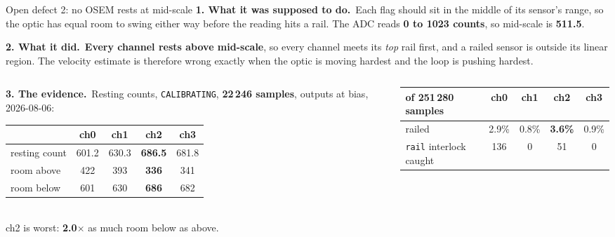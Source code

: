 \documentclass[aspectratio=169]{beamer}
\newcommand{\intended}{\textbf{1. What it was supposed to do.}}
\newcommand{\actual}{\textbf{2. What it did.}}
\newcommand{\evidence}{\textbf{3. The evidence.}}
\begin{document}
\begin{frame}{Open defect 2: no OSEM rests at mid-scale}
  \footnotesize
  \intended\ Each flag should sit in the middle of its sensor's range, so the
  optic has equal room to swing either way before the reading hits a rail. The
  ADC reads \textbf{0 to 1023 counts}, so mid-scale is \textbf{511.5}.

  \vspace{1mm}
  \actual\ \textbf{Every channel rests above mid-scale}, so every channel meets
  its \emph{top} rail first, and a railed sensor is outside its linear region.
  The velocity estimate is therefore wrong exactly when the optic is moving
  hardest and the loop is pushing hardest.

  \vspace{1.5mm}
  \begin{columns}[T]
    \begin{column}{0.49\textwidth}
      \evidence\ Resting counts, \texttt{CALIBRATING}, \textbf{22\,246 samples},
      outputs at bias, 2026-08-06:

      \vspace{1mm}
      \centering
      {\scriptsize\setlength{\tabcolsep}{4pt}
      \begin{tabular}{@{}lcccc@{}}
        \toprule
        & ch0 & ch1 & \textbf{ch2} & ch3 \\
        \midrule
        resting count & 601.2 & 630.3 & \textbf{686.5} & 681.8 \\
        room above & 422 & 393 & \textbf{336} & 341 \\
        room below & 601 & 630 & \textbf{686} & 682 \\
        \bottomrule
      \end{tabular}}\\[1mm]
      {\scriptsize ch2 is worst: \textbf{2.0$\times$} as much room below as
      above.}
    \end{column}
    \begin{column}{0.48\textwidth}
      \centering
      {\scriptsize\setlength{\tabcolsep}{4pt}
      \begin{tabular}{@{}lcccc@{}}
        \toprule
        of 251\,280 samples & ch0 & ch1 & \textbf{ch2} & ch3 \\
        \midrule
        railed & 2.9\% & 0.8\% & \textbf{3.6\%} & 0.9\% \\
        \texttt{rail} interlock caught & 136 & 0 & 51 & 0 \\
        \bottomrule
      \end{tabular}}


\end{column}
\end{columns}
\end{frame}
\end{document}
